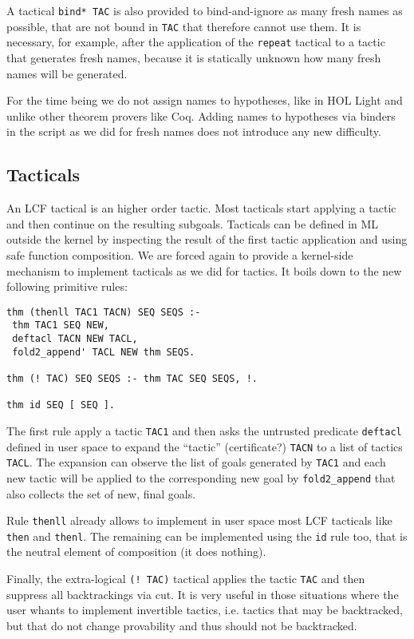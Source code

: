 \documentclass[preprint]{sigplanconf}
\begin{document}
A tactical \verb+bind* TAC+ is also provided to bind-and-ignore as many fresh names as possible, that are not bound in \verb+TAC+ that therefore cannot use them. It is necessary, for example, after the application of the \verb+repeat+ tactical to a tactic that generates fresh names, because it is statically unknown how many fresh names will be generated.

For the time being we do not assign names to hypotheses, like in HOL Light and unlike other theorem provers like Coq. Adding names to hypotheses via binders in the script as we did for fresh names does not introduce any new difficulty.

\subsection{Tacticals}
An LCF tactical is an higher order tactic. Most tacticals start applying a tactic and then continue on the resulting subgoals. Tacticals can be defined in ML outside the kernel by inspecting the result of the first tactic application and using safe function composition. We are forced again to provide a kernel-side mechanism to implement tacticals as we did for tactics. It boils down to the new following primitive rules:

\begin{small}
\begin{verbatim}
thm (thenll TAC1 TACN) SEQ SEQS :-
 thm TAC1 SEQ NEW,
 deftacl TACN NEW TACL,
 fold2_append' TACL NEW thm SEQS.

thm (! TAC) SEQ SEQS :- thm TAC SEQ SEQS, !.

thm id SEQ [ SEQ ].
\end{verbatim}
\end{small}

The first rule apply a tactic \verb+TAC1+ and then asks the untrusted predicate \verb+deftacl+ defined in user space to expand the ``tactic'' (certificate?) \verb+TACN+ to a list of tactics \verb+TACL+. The expansion can observe the list of goals generated by \verb+TAC1+ and each new tactic will be applied to the corresponding new goal by \verb+fold2_append+ that also collects the set of new, final goals.

Rule \verb+thenll+ already allows to implement in user space most LCF tacticals like \verb+then+ and \verb+thenl+. The remaining can be implemented using the \verb+id+ rule too, that is the neutral element of composition (it does nothing).

Finally, the extra-logical \verb+(! TAC)+ tactical applies the tactic \verb+TAC+ and then suppress all backtrackings via cut. It is very useful in those situations where the user whants to implement invertible tactics, i.e. tactics that may be backtracked, but that do not change provability and thus should not be backtracked.
\end{document}
